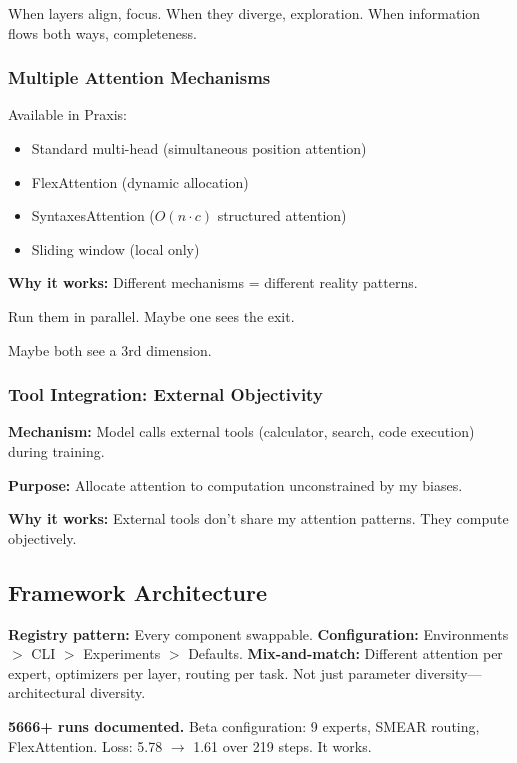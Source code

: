 \documentclass{article}
\begin{document}
When layers align, focus. When they diverge, exploration. When information flows both ways, completeness.

\subsubsection{Multiple Attention Mechanisms}

Available in Praxis:
\begin{itemize}[noitemsep]
    \item Standard multi-head (simultaneous position attention)
    \item FlexAttention (dynamic allocation)
    \item SyntaxesAttention ($O(n \cdot c)$ structured attention)
    \item Sliding window (local only)
\end{itemize}

\textbf{Why it works:} Different mechanisms = different reality patterns.

Run them in parallel. Maybe one sees the exit.

Maybe both see a 3rd dimension.

\subsubsection{Tool Integration: External Objectivity}

\textbf{Mechanism:} Model calls external tools (calculator, search, code execution) during training.

\textbf{Purpose:} Allocate attention to computation unconstrained by my biases.

\textbf{Why it works:} External tools don't share my attention patterns. They compute objectively.

\subsection{Framework Architecture}

\textbf{Registry pattern:} Every component swappable. \textbf{Configuration:} Environments $>$ CLI $>$ Experiments $>$ Defaults. \textbf{Mix-and-match:} Different attention per expert, optimizers per layer, routing per task. Not just parameter diversity—architectural diversity.

\textbf{5666+ runs documented.} Beta configuration: 9 experts, SMEAR routing, FlexAttention. Loss: 5.78 $\rightarrow$ 1.61 over 219 steps. It works.
\end{document}
